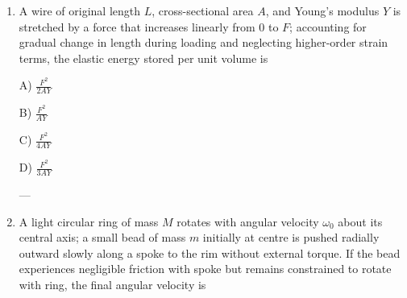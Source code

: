 \documentclass[12pt]{article}
\begin{document}
\begin{enumerate}[leftmargin=*]

\begin{center}
\end{center}

A) \(\sqrt{\frac{g}{R}}\left(1-\frac{\Omega}{8\pi}\right)\)  

B) \(\sqrt{\frac{g}{R}}\left(1-\frac{\Omega}{4\pi}\right)\)  

C) \(\sqrt{\frac{g}{R}}\left(1+\frac{\Omega}{8\pi}\right)\)  

D) \(\sqrt{\frac{g}{R}}\left(1-\frac{\Omega}{2\pi}\right)\)  

---

\item A wire of original length \(L\), cross-sectional area \(A\), and Young’s modulus \(Y\) is stretched by a force that increases linearly from 0 to \(F\); accounting for gradual change in length during loading and neglecting higher-order strain terms, the elastic energy stored per unit volume is  

A) \(\frac{F^2}{2AY}\)  

B) \(\frac{F^2}{AY}\)  

C) \(\frac{F^2}{4AY}\)  

D) \(\frac{F^2}{3AY}\)  

---

\item A light circular ring of mass \(M\) rotates with angular velocity \(\omega_0\) about its central axis; a small bead of mass \(m\) initially at centre is pushed radially outward slowly along a spoke to the rim without external torque. If the bead experiences negligible friction with spoke but remains constrained to rotate with ring, the final angular velocity is  


\begin{tikzpicture}[scale=1.1]


\end{tikzpicture}
\end{enumerate}
\end{document}
